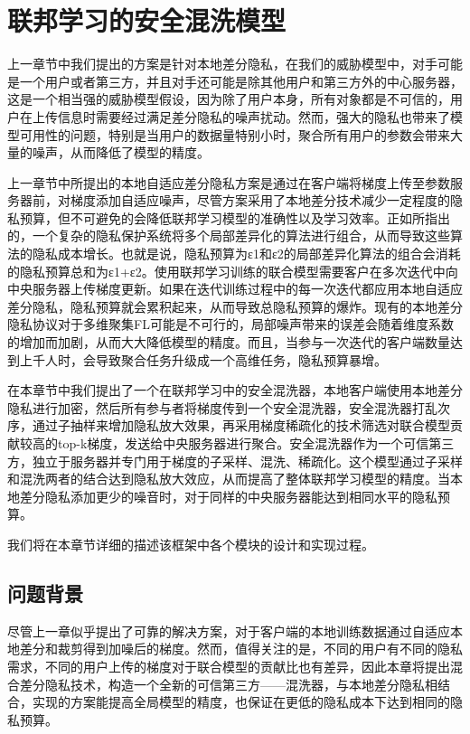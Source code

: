 \chapter{联邦学习的安全混洗模型}
\label{ch4}

上一章节中我们提出的方案是针对本地差分隐私，在我们的威胁模型中，对手可能是一个用户或者第三方，并且对手还可能是除其他用户和第三方外的中心服务器，这是一个相当强的威胁模型假设，因为除了用户本身，所有对象都是不可信的，用户在上传信息时需要经过满足差分隐私的噪声扰动。然而，强大的隐私也带来了模型可用性的问题，特别是当用户的数据量特别小时，聚合所有用户的参数会带来大量的噪声，从而降低了模型的精度。

上一章节中所提出的本地自适应差分隐私方案是通过在客户端将梯度上传至参数服务器前，对梯度添加自适应噪声，尽管方案采用了本地差分技术减少一定程度的隐私预算，但不可避免的会降低联邦学习模型的准确性以及学习效率。正如所指出的，一个复杂的隐私保护系统将多个局部差异化的算法进行组合，从而导致这些算法的隐私成本增长。也就是说，隐私预算为ε1和ε2的局部差异化算法的组合会消耗的隐私预算总和为ε1+ε2。使用联邦学习训练的联合模型需要客户在多次迭代中向中央服务器上传梯度更新。如果在迭代训练过程中的每一次迭代都应用本地自适应差分隐私，隐私预算就会累积起来，从而导致总隐私预算的爆炸。现有的本地差分隐私协议对于多维聚集FL可能是不可行的，局部噪声带来的误差会随着维度系数的增加而加剧，从而大大降低模型的精度。而且，当参与一次迭代的客户端数量达到上千人时，会导致聚合任务升级成一个高维任务，隐私预算暴增。

在本章节中我们提出了一个在联邦学习中的安全混洗器，本地客户端使用本地差分隐私进行加密，然后所有参与者将梯度传到一个安全混洗器，安全混洗器打乱次序，通过子抽样来增加隐私放大效果，再采用梯度稀疏化的技术筛选对联合模型贡献较高的top-k梯度，发送给中央服务器进行聚合。安全混洗器作为一个可信第三方，独立于服务器并专门用于梯度的子采样、混洗、稀疏化。这个模型通过子采样和混洗两者的结合达到隐私放大效应，从而提高了整体联邦学习模型的精度。当本地差分隐私添加更少的噪音时，对于同样的中央服务器能达到相同水平的隐私预算。

我们将在本章节详细的描述该框架中各个模块的设计和实现过程。

\section{问题背景}
尽管上一章似乎提出了可靠的解决方案，对于客户端的本地训练数据通过自适应本地差分和裁剪得到加噪后的梯度。然而，值得关注的是，不同的用户有不同的隐私需求，不同的用户上传的梯度对于联合模型的贡献比也有差异，因此本章将提出混合差分隐私技术，构造一个全新的可信第三方——混洗器，与本地差分隐私相结合，实现的方案能提高全局模型的精度，也保证在更低的隐私成本下达到相同的隐私预算。

